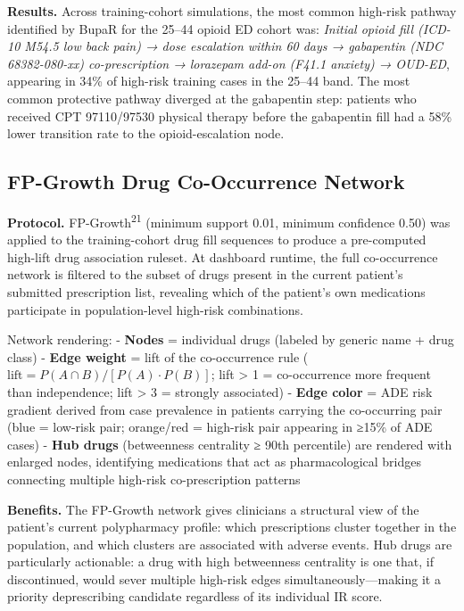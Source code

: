 \documentclass[
  12pt,
]{book}
\begin{document}
\textbf{Results.} Across training-cohort simulations, the most common
high-risk pathway identified by BupaR for the 25--44 opioid ED cohort
was: \emph{Initial opioid fill (ICD-10 M54.5 low back pain) → dose
escalation within 60 days → gabapentin (NDC 68382-080-xx)
co-prescription → lorazepam add-on (F41.1 anxiety) → OUD-ED}, appearing
in 34\% of high-risk training cases in the 25--44 band. The most common
protective pathway diverged at the gabapentin step: patients who
received CPT 97110/97530 physical therapy before the gabapentin fill had
a 58\% lower transition rate to the opioid-escalation node.

\subsection{FP-Growth Drug Co-Occurrence
Network}\label{fp-growth-drug-co-occurrence-network}

\textbf{Protocol.} FP-Growth\textsuperscript{21} (minimum support 0.01,
minimum confidence 0.50) was applied to the training-cohort drug fill
sequences to produce a pre-computed high-lift drug association ruleset.
At dashboard runtime, the full co-occurrence network is filtered to the
subset of drugs present in the current patient's submitted prescription
list, revealing which of the patient's own medications participate in
population-level high-risk combinations.

Network rendering: - \textbf{Nodes} = individual drugs (labeled by
generic name + drug class) - \textbf{Edge weight} = lift of the
co-occurrence rule (\(\text{lift} = P(A \cap B) / [P(A) \cdot P(B)]\);
lift \textgreater{} 1 = co-occurrence more frequent than independence;
lift \textgreater{} 3 = strongly associated) - \textbf{Edge color} = ADE
risk gradient derived from case prevalence in patients carrying the
co-occurring pair (blue = low-risk pair; orange/red = high-risk pair
appearing in ≥15\% of ADE cases) - \textbf{Hub drugs} (betweenness
centrality ≥ 90th percentile) are rendered with enlarged nodes,
identifying medications that act as pharmacological bridges connecting
multiple high-risk co-prescription patterns

\textbf{Benefits.} The FP-Growth network gives clinicians a structural
view of the patient's current polypharmacy profile: which prescriptions
cluster together in the population, and which clusters are associated
with adverse events. Hub drugs are particularly actionable: a drug with
high betweenness centrality is one that, if discontinued, would sever
multiple high-risk edges simultaneously---making it a priority
deprescribing candidate regardless of its individual IR score.
\end{document}

